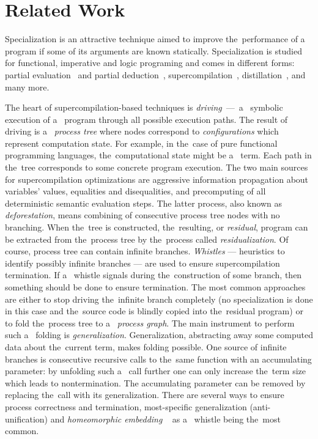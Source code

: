 \section{Related Work}

Specialization is an attractive technique aimed to improve the~performance of a~ program if some of its arguments are known statically.
Specialization is studied for functional, imperative and logic programing and comes in different forms: partial evaluation~\cite{jonesbook} and partial deduction~\cite{lloyd1991partial}, supercompilation~\cite{soerensen1996positive}, distillation~\cite{hamilton2007distillation}, and many more.


The heart of supercompilation-based techniques is \emph{driving}~---~a~ symbolic execution of a~ program through all possible execution paths.
The result of driving is a~ \emph{process tree} where nodes correspond to \emph{configurations} which represent computation state.
For example, in the~case of pure functional programming languages, the~computational state might be a~ term.
Each path in the~tree corresponds to some concrete program execution.
The two main sources for supercompilation optimizations are aggressive information propagation about variables' values, equalities and disequalities, and precomputing of all deterministic semantic evaluation steps.
The latter process, also known as \emph{deforestation}, means combining of consecutive process tree nodes with no branching.
When the~tree is constructed, the~resulting, or \emph{residual}, program can be extracted from the~process tree by the~process called \emph{residualization}.
Of course, process tree can contain infinite branches.
\emph{Whistles} --- heuristics to identify possibly infinite branches --- are used to ensure supercompilation termination.
If a~ whistle signals during the~construction of some branch, then something should be done to ensure termination.
The most common approaches are either to stop driving the~infinite branch completely (no specialization is done in this case and the~source code is blindly copied into the~residual program) or to fold the~process tree to a~ \emph{process graph}.
The main instrument to perform such a~ folding is \emph{generalization}.
Generalization, abstracting away some computed data about the~current term, makes folding possible.
One source of infinite branches is consecutive recursive calls to the~same function with an accumulating parameter: by unfolding such a~ call further one can only increase the~term size which leads to nontermination.
The accumulating parameter can be removed by replacing the~call with its generalization.
There are several ways to ensure process correctness and termination,
most-specific generalization (anti-unification) and \emph{homeomorphic embedding} ~\cite{Higman52,Kruskal60} as a~ whistle being the~most common.

